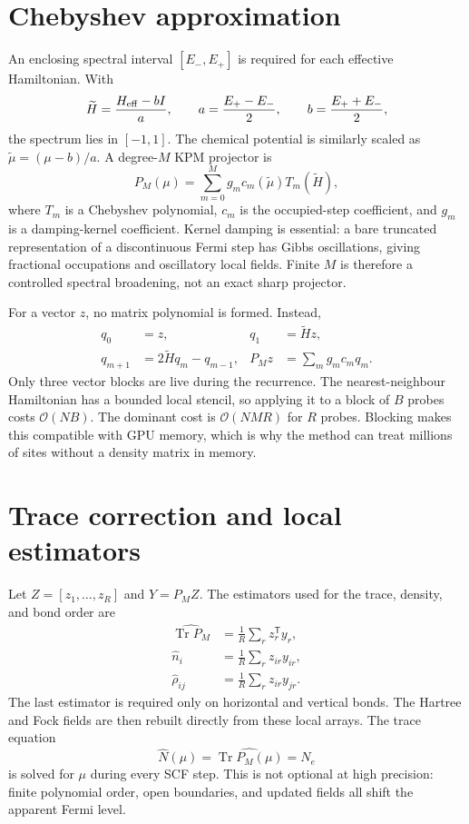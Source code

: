 \documentclass[11pt,a4paper]{article}
\newcommand{\Tr}{\operatorname{Tr}}
\begin{document}
\section{\hspace{0.5em}Chebyshev approximation}
An enclosing spectral interval $[E_-,E_+]$ is required for each effective
Hamiltonian. With
\begin{equation}
 \widetilde H=\frac{H_{\rm eff}-bI}{a},\qquad
 a=\frac{E_+-E_-}{2},\qquad b=\frac{E_++E_-}{2},
\end{equation}
the spectrum lies in $[-1,1]$. The chemical potential is similarly scaled as
$\widetilde\mu=(\mu-b)/a$. A degree-$M$ KPM projector is
\begin{equation}
 P_M(\mu)=\sum_{m=0}^{M}g_m c_m(\widetilde\mu) T_m(\widetilde H),
 \label{eq:kpm}
\end{equation}
where $T_m$ is a Chebyshev polynomial, $c_m$ is the occupied-step coefficient,
and $g_m$ is a damping-kernel coefficient. Kernel damping is essential: a
bare truncated representation of a discontinuous Fermi step has Gibbs
oscillations, giving fractional occupations and oscillatory local fields.
Finite $M$ is therefore a controlled spectral broadening, not an exact sharp
projector.

For a vector $z$, no matrix polynomial is formed. Instead,
\begin{align}
 q_0&=z, &q_1&=\widetilde H z,\\
 q_{m+1}&=2\widetilde Hq_m-q_{m-1},& P_Mz&=\sum_m g_mc_mq_m .
 \label{eq:recurrence}
\end{align}
Only three vector blocks are live during the recurrence. The nearest-neighbour
Hamiltonian has a bounded local stencil, so applying it to a block of $B$
probes costs $\mathcal O(NB)$. The dominant cost is $\mathcal O(NMR)$ for $R$
probes. Blocking makes this compatible with GPU memory, which is why the
method can treat millions of sites without a density matrix in memory.

\section{\hspace{0.5em}Trace correction and local estimators}
Let $Z=[z_1,\ldots,z_R]$ and $Y=P_MZ$. The estimators used for the trace,
density, and bond order are
\begin{align}
 \widehat{\Tr P_M}&=\frac1R\sum_r z_r^\mathsf T y_r,\\
 \widehat n_i&=\frac1R\sum_r z_{ir}y_{ir},\\
 \widehat\rho_{ij}&=\frac1R\sum_r z_{ir}y_{jr}.
 \label{eq:estimators}
\end{align}
The last estimator is required only on horizontal and vertical bonds. The
Hartree and Fock fields are then rebuilt directly from these local arrays. The
trace equation
\begin{equation}
 \widehat N(\mu)=\widehat{\Tr P_M(\mu)}=N_e
\end{equation}
is solved for $\mu$ during every SCF step. This is not optional at high
precision: finite polynomial order, open boundaries, and updated fields all
shift the apparent Fermi level.
\end{document}
